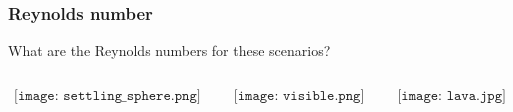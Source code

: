 \documentclass{beamer}
\begin{document}
\begin{frame}
  \frametitle{Reynolds number}

  What are the Reynolds numbers for these scenarios?
  
  \begin{columns}[t]

    \begin{column}{0.33\paperwidth}

      $$\texttt{[image: settling\_sphere.png]}$$
      
    \end{column}

    \begin{column}{0.33\paperwidth}

      $$\texttt{[image: visible.png]}$$
      
    \end{column}

    \begin{column}{0.33\paperwidth}

      $$\texttt{[image: lava.jpg]}$$
      
    \end{column}
  \end{columns}
  
\end{frame}
\end{document}
